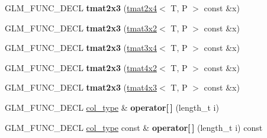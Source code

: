 \begin{DoxyCompactItemize}
\item 
G\+L\+M\+\_\+\+F\+U\+N\+C\+\_\+\+D\+E\+CL {\bfseries tmat2x3} (\hyperlink{structglm_1_1detail_1_1tmat2x4}{tmat2x4}$<$ T, P $>$ const \&x)\hypertarget{structglm_1_1detail_1_1tmat2x3_a54b8586adbda881d55b2c98a39ed58c5}{}\label{structglm_1_1detail_1_1tmat2x3_a54b8586adbda881d55b2c98a39ed58c5}

\item 
G\+L\+M\+\_\+\+F\+U\+N\+C\+\_\+\+D\+E\+CL {\bfseries tmat2x3} (\hyperlink{structglm_1_1detail_1_1tmat3x2}{tmat3x2}$<$ T, P $>$ const \&x)\hypertarget{structglm_1_1detail_1_1tmat2x3_acdd851e9160ca0515af9eef17a698d36}{}\label{structglm_1_1detail_1_1tmat2x3_acdd851e9160ca0515af9eef17a698d36}

\item 
G\+L\+M\+\_\+\+F\+U\+N\+C\+\_\+\+D\+E\+CL {\bfseries tmat2x3} (\hyperlink{structglm_1_1detail_1_1tmat3x4}{tmat3x4}$<$ T, P $>$ const \&x)\hypertarget{structglm_1_1detail_1_1tmat2x3_a715213bd6e4ad7b7c4757590821b7ef2}{}\label{structglm_1_1detail_1_1tmat2x3_a715213bd6e4ad7b7c4757590821b7ef2}

\item 
G\+L\+M\+\_\+\+F\+U\+N\+C\+\_\+\+D\+E\+CL {\bfseries tmat2x3} (\hyperlink{structglm_1_1detail_1_1tmat4x2}{tmat4x2}$<$ T, P $>$ const \&x)\hypertarget{structglm_1_1detail_1_1tmat2x3_acc53a40969e8baec1323cbcd3db5021f}{}\label{structglm_1_1detail_1_1tmat2x3_acc53a40969e8baec1323cbcd3db5021f}

\item 
G\+L\+M\+\_\+\+F\+U\+N\+C\+\_\+\+D\+E\+CL {\bfseries tmat2x3} (\hyperlink{structglm_1_1detail_1_1tmat4x3}{tmat4x3}$<$ T, P $>$ const \&x)\hypertarget{structglm_1_1detail_1_1tmat2x3_a954965401031a46da66fcbb18536ead0}{}\label{structglm_1_1detail_1_1tmat2x3_a954965401031a46da66fcbb18536ead0}

\item 
G\+L\+M\+\_\+\+F\+U\+N\+C\+\_\+\+D\+E\+CL \hyperlink{structglm_1_1detail_1_1tvec3}{col\+\_\+type} \& {\bfseries operator\mbox{[}$\,$\mbox{]}} (length\+\_\+t i)\hypertarget{structglm_1_1detail_1_1tmat2x3_a68883354758d90780a8f45ecdef13ef9}{}\label{structglm_1_1detail_1_1tmat2x3_a68883354758d90780a8f45ecdef13ef9}

\item 
G\+L\+M\+\_\+\+F\+U\+N\+C\+\_\+\+D\+E\+CL \hyperlink{structglm_1_1detail_1_1tvec3}{col\+\_\+type} const \& {\bfseries operator\mbox{[}$\,$\mbox{]}} (length\+\_\+t i) const \hypertarget{structglm_1_1detail_1_1tmat2x3_a2eed304fc29634e2129360dbb3856666}{}\label{structglm_1_1detail_1_1tmat2x3_a2eed304fc29634e2129360dbb3856666}


\end{DoxyCompactItemize}
